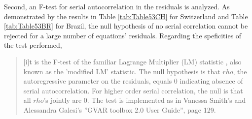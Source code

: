 \documentclass[a4paper, twoside]{templates/ociamthesis}
\begin{document}
Second, an F-test for serial autocorrelation in the residuals is analyzed. As demonstrated by the results in Table \ref{tab:Table53CH} for Switzerland and Table \ref{tab:Table53BR} for Brazil, the null hypothesis of no serial correlation cannot be rejected for a large number of equations' residuals. Regarding the speficities of the test performed,

\begin{quote}
{[}i{]}t is the F-test of the familiar Lagrange Multiplier (LM) statistic \autocites*[see Godfrey][]{godfrey1978,godfrey1978a}, also known as the 'modified LM' statistic. The null hypothesis is that \(rho\), the autoregressive parameter on the residuals, equals 0 indicating absence of serial autocorrelation. For higher order serial correlation, the null is that all \(rho\)'s jointly are 0. The test is implemented as in Vanessa Smith's and Alessandra Galesi's ''GVAR toolbox 2.0 User Guide'', page 129. \autocite[ 34]{bock2021}
\end{quote}

\begin{table}[!ht]

\caption{\label{tab:Table53CH}First order serial autocorrelation of cross-country residuals (F-test) for Switzerland}
\centering
{}
\end{table}
\end{document}
